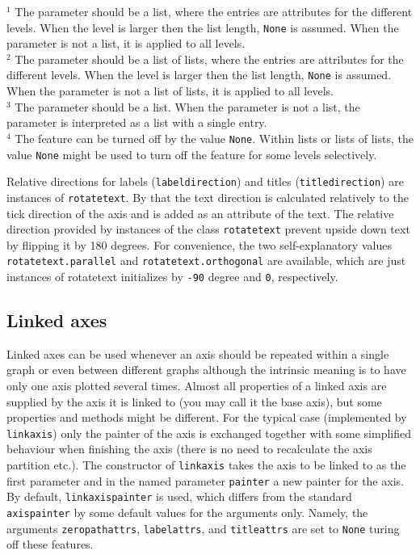 $^1$
The parameter should be a list, where the entries are attributes
for the different levels. When the level is larger then the list
length, \verb|None| is assumed. When the parameter is not a list,
it is applied to all levels.\\
$^2$
The parameter should be a list of lists, where the entries are
attributes for the different levels. When the level is larger then the
list length, \verb|None| is assumed. When the parameter is not a
list of lists, it is applied to all levels.\\
$^3$
The parameter should be a list. When the parameter is not a
list, the parameter is interpreted as a list with a single
entry.\\
$^4$
The feature can be turned off by the value \verb|None|. Within
lists or lists of lists, the value \verb|None| might be
used to turn off the feature for some levels selectively.
\medskip

Relative directions for labels (\verb|labeldirection|) and titles
(\verb|titledirection|) are instances of \verb|rotatetext|. By that
the text direction is calculated relatively to the tick direction of
the axis and is added as an attribute of the text. The relative
direction provided by instances of the class \verb|rotatetext| prevent
upside down text by flipping it by 180 degrees. For convenience, the
two self-explanatory values \verb|rotatetext.parallel| and
\verb|rotatetext.orthogonal| are available, which are just instances of
rotatetext initializes by \verb|-90| degree and \verb|0|,
respectively.

\subsection{Linked axes}

Linked axes can be used whenever an axis should be repeated within a
single graph or even between different graphs although the intrinsic
meaning is to have only one axis plotted several times. Almost all
properties of a linked axis are supplied by the axis it is linked to
(you may call it the base axis), but some properties and methods might
be different. For the typical case (implemented by \verb|linkaxis|)
only the painter of the axis is exchanged together with some
simplified behaviour when finishing the axis (there is no need to
recalculate the axis partition etc.). The constructor of
\verb|linkaxis| takes the axis to be linked to as the first parameter
and in the named parameter \verb|painter| a new painter for the axis.
By default, \verb|linkaxispainter| is used, which differs from the
standard \verb|axispainter| by some default values for the arguments
only. Namely, the arguments \verb|zeropathattrs|, \verb|labelattrs|,
and \verb|titleattrs| are set to \verb|None| turing off these
features.

